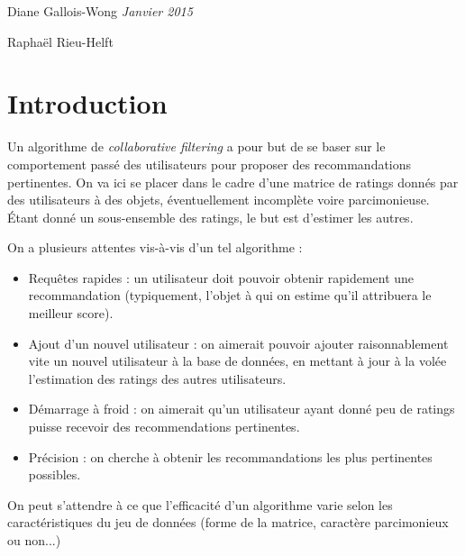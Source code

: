 \documentclass[11pt, openany, a4paper]{article}
\begin{document}
Diane Gallois-Wong
\hfill
\emph{Janvier 2015}

Raphaël Rieu-Helft

\vspace{2.5em}

\begin{centering}

\LARGE{\textbf{Algorithmes pour les systèmes de recommandation : un comparatif}

\end{centering}

\vspace{2em}

\section*{Introduction}

Un algorithme de \emph{collaborative filtering} a pour but de se baser sur le comportement passé des utilisateurs pour proposer des recommandations pertinentes. On va ici se placer dans le cadre d'une matrice de ratings donnés par des utilisateurs à des objets, éventuellement incomplète voire parcimonieuse. Étant donné un sous-ensemble des ratings, le but est d'estimer les autres.

On a plusieurs attentes vis-à-vis d'un tel algorithme :
\begin{itemize}
	\item{Requêtes rapides : un utilisateur doit pouvoir obtenir rapidement une recommandation (typiquement, l'objet à qui on estime qu'il attribuera le meilleur score).}
	\item{Ajout d'un nouvel utilisateur : on aimerait pouvoir ajouter raisonnablement vite un nouvel utilisateur à la base de données, en mettant à jour à la volée l'estimation des ratings des autres utilisateurs.}
	\item{Démarrage à froid : on aimerait qu'un utilisateur ayant donné peu de ratings puisse recevoir des recommendations pertinentes.}
	\item{Précision : on cherche à obtenir les recommandations les plus pertinentes possibles.}
\end{itemize}

On peut s'attendre à ce que l'efficacité d'un algorithme varie selon les caractéristiques du jeu de données (forme de la matrice, caractère parcimonieux ou non...)
\end{document}
